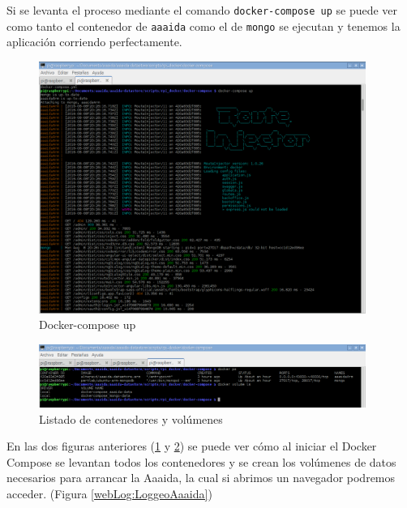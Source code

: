 Si se levanta el proceso mediante el comando \texttt{docker-compose up} se puede ver como tanto el contenedor de \texttt{aaaida} como el de \texttt{mongo} se ejecutan y tenemos la aplicación corriendo perfectamente.

\begin{figure}[htb]
\begin{center}
\includegraphics[width=0.95\textwidth]{./setup/dockerComposeUp}
\caption{Docker-compose up}
\label{ComUp:composeUp}
\end{center}
\end{figure} 
\pagebreak

\begin{figure}[htb]
\begin{center}
\includegraphics[width=0.95\textwidth]{./setup/dockerpsVolumen}
\caption{Listado de contenedores y volúmenes}
\label{psVl:psVolumen}
\end{center}
\end{figure} 

En las dos figuras anteriores (\ref{ComUp:composeUp} y \ref{psVl:psVolumen}) se puede ver cómo al iniciar el Docker Compose se levantan todos los contenedores y se crean los volúmenes de datos necesarios para arrancar la Aaaida, la cual si abrimos un navegador podremos acceder. (Figura \ref{webLog:LoggeoAaaida}) 


